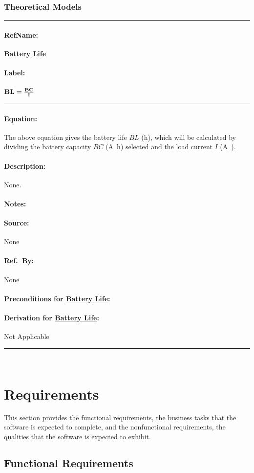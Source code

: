 \documentclass[12pt]{article}
\newcommand{\deftheory}[9][Not Applicable]
{
\newpage
\noindent \rule{\textwidth}{0.5mm}

\paragraph{RefName: } \textbf{#2} \phantomsection 
\label{#2}

\paragraph{Label:} #3

\noindent \rule{\textwidth}{0.5mm}

\paragraph{Equation:}

#4

\paragraph{Description:}

#5

\paragraph{Notes:}

#6

\paragraph{Source:}

#7

\paragraph{Ref.\ By:}

#8

\paragraph{Preconditions for \hyperref[#2]{#2}:}
\label{#2_precond}

#9

\paragraph{Derivation for \hyperref[#2]{#2}:}
\label{#2_deriv}

#1

\noindent \rule{\textwidth}{0.5mm}

}
\begin{document}
\subsubsection{Theoretical Models}\label{sec_theoretical}


\noindent
\deftheory
{Battery Life}
{
  ${\bf BL = \frac{BC}{I}}$
}

{
The above equation gives the battery life $BL$ (\si{\hour}), which will be calculated by dividing the battery capacity $BC$ (\si{\ampere\hour}) selected and the load current $I$ (\si{\ampere)}.
}
{
None.
}
{
 
}
{
None
}
{
None
}
{}

~\newpage
\section{Requirements}

This section provides the functional requirements, the business tasks that the software is expected to complete, and the nonfunctional requirements, the qualities that the software is expected to exhibit.

\subsection{Functional Requirements}
\end{document}
